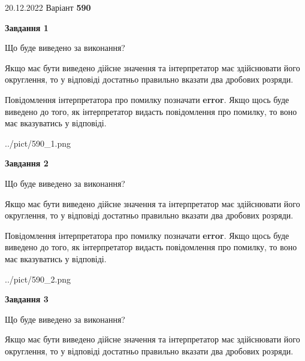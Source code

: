 \documentclass[12pt, ukrainian]{article}
\begin{document}
{20.12.2022 Варіант \No \textbf { 590 }\par}
{
\begin {Large}

{\begin {center}\textbf{Завдання 1}\end {center}}\par
Що буде виведено за виконання? \par

Якщо має бути виведено дійсне значення та інтерпретатор має здійснювати його округлення, 
то у відповіді достатньо правильно вказати два дробових розряди.

Повідомлення інтерпретатора про помилку позначати \textbf{error}.
Якщо щось буде виведено до того, як інтерпретатор видасть повідомлення про помилку, 
то воно має вказуватись у відповіді. \par

\begin{center}
	{../pict/590_1.png}
\end{center}
\newpage

{\begin {center}\textbf{Завдання 2}\end {center}}\par
Що буде виведено за виконання? \par

Якщо має бути виведено дійсне значення та інтерпретатор має здійснювати його округлення, 
то у відповіді достатньо правильно вказати два дробових розряди.

Повідомлення інтерпретатора про помилку позначати \textbf{error}.
Якщо щось буде виведено до того, як інтерпретатор видасть повідомлення про помилку, 
то воно має вказуватись у відповіді. \par

\begin{center}
	{../pict/590_2.png}
\end{center}
\newpage

{\begin {center}\textbf{Завдання 3}\end {center}}\par
Що буде виведено за виконання? \par

Якщо має бути виведено дійсне значення та інтерпретатор має здійснювати його округлення, 
то у відповіді достатньо правильно вказати два дробових розряди.


\end{Large}}
\end{document}

